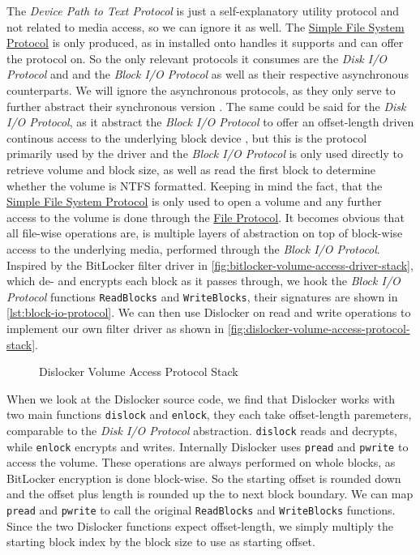 The \emph{Device Path to Text Protocol} is just a self-explanatory utility protocol and not related to media access, so we can ignore it as well.
The \hyperref[lst:simple-filesytem-protocol]{Simple File System Protocol} is only produced, as in installed onto handles it supports and can offer the protocol on.
So the only relevant protocols it consumes are the \emph{Disk \ac{I/O} Protocol} and and the \emph{Block \ac{I/O} Protocol} as well as their respective asynchronous counterparts.
We will ignore the asynchronous protocols, as they only serve to further abstract their synchronous version \cite[13.8 and 13.10]{uefi-spec}.
The same could be said for the \emph{Disk \ac{I/O} Protocol}, as it abstract the \emph{Block \ac{I/O} Protocol} to offer an offset-length driven continous access to the underlying block device \cite[13.7]{uefi-spec}, but this is the protocol primarily used by the driver and the \emph{Block \ac{I/O} Protocol} is only used directly to retrieve volume and block size, as well as read the first block to determine whether the volume is \ac{NTFS} formatted.
Keeping in mind the fact, that the \hyperref[lst:simple-filesytem-protocol]{Simple File System Protocol} is only used to open a volume and any further access to the volume is done through the \hyperref[lst:file-protocol]{File Protocol}.
It becomes obvious that all file-wise operations are, is multiple layers of abstraction on top of block-wise access to the underlying media, performed through the \emph{Block \ac{I/O} Protocol}.
Inspired by the BitLocker filter driver in \autoref{fig:bitlocker-volume-access-driver-stack}, which de- and encrypts each block as it passes through, we hook the \emph{Block \ac{I/O} Protocol} functions \lstinline{ReadBlocks} and \lstinline{WriteBlocks}, their signatures are shown in \autoref{lst:block-io-protocol}.
We can then use Dislocker on read and write operations to implement our own filter driver as shown in \autoref{fig:dislocker-volume-access-protocol-stack}.


\begin{figure}[htb]%
    \centering
    
    \caption{Dislocker Volume Access Protocol Stack}%
    \label{fig:dislocker-volume-access-protocol-stack}%
\end{figure}

When we look at the Dislocker source code, we find that Dislocker works with two main functions \lstinline{dislock} and \lstinline{enlock}, they each take offset-length paremeters, comparable to the \emph{Disk \ac{I/O} Protocol} abstraction.
\lstinline{dislock} reads and decrypts, while \lstinline{enlock} encrypts and writes.
Internally Dislocker uses \lstinline{pread} and \lstinline{pwrite} to access the volume.
These operations are always performed on whole blocks, as BitLocker encryption is done block-wise.
So the starting offset is rounded down and the offset plus length is rounded up the to next block boundary.
We can map \lstinline{pread} and \lstinline{pwrite} to call the original \lstinline{ReadBlocks} and \lstinline{WriteBlocks} functions.
Since the two Dislocker functions expect offset-length, we simply multiply the starting block index by the block size to use as starting offset.


